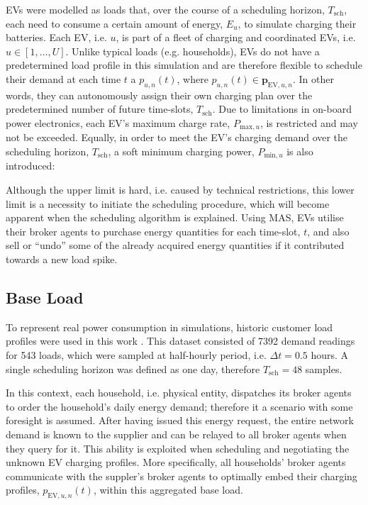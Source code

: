 EVs were modelled as loads that, over the course of a scheduling horizon, $T_\text{sch}$, each need to consume a certain amount of energy, $E_u$, to simulate charging their batteries.
Each EV, i.e. $u$, is part of a fleet of charging and coordinated EVs, i.e. $u \in [1, \dots, U]$.
Unlike typical loads (e.g. households), EVs do not have a predetermined load profile in this simulation and are therefore flexible to schedule their demand at each time $t$ a $p_{u,n}(t)$, where $p_{u,n}(t) \in \textbf{p}_{\text{EV},u,n}$.
In other words, they can autonomously assign their own charging plan over the predetermined number of future time-slots, $T_\text{sch}$.
Due to limitations in on-board power electronics, each EV's maximum charge rate, $P_{\text{max},u}$, is restricted and may not be exceeded.
Equally, in order to meet the EV's charging demand over the scheduling horizon, $T_\text{sch}$, a soft minimum charging power, $P_{\text{min},u}$ is also introduced:



Although the upper limit is hard, i.e. caused by technical restrictions, this lower limit is a necessity to initiate the scheduling procedure, which will become apparent when the scheduling algorithm is explained.
Using MAS, EVs utilise their broker agents to purchase energy quantities for each time-slot, $t$, and also sell or ``undo'' some of the already acquired energy quantities if it contributed towards a new load spike.

\subsection{Base Load}


To represent real power consumption in simulations, historic customer load profiles were used in this work \cite{IrishData2002}.
This dataset consisted of 7392 demand readings for 543 loads, which were sampled at half-hourly period, i.e. $\Delta t = 0.5$ hours.
A single scheduling horizon was defined as one day, therefore $T_\text{sch}=48$ samples.

In this context, each household, i.e. physical entity, dispatches its broker agents to order the household's daily energy demand; therefore it a scenario with some foresight is assumed.
After having issued this energy request, the entire network demand is known to the supplier and can be relayed to all broker agents when they query for it.
This ability is exploited when scheduling and negotiating the unknown EV charging profiles.
More specifically, all households' broker agents communicate with the suppler's broker agents to optimally embed their charging profiles, $p_{\text{EV},u,n}(t)$, within this aggregated base load.

